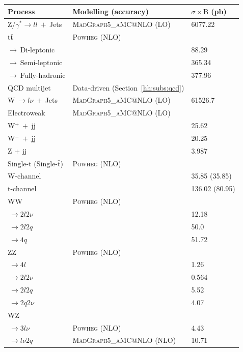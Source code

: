 \documentclass[../main.tex]{subfiles}
\begin{document}
\begin{table}[p]
\begin{footnotesize}
\begin{center}

	\begin{tabular}{l | l | l}
		\hline\hline
		Process & Modelling (accuracy) & $\sigma\times\mathrm{B}$ (pb) \\\hline\hline
		Z/$\gamma^*\to ll~+~$Jets & \textsc{MadGraph5\_aMC@NLO} (LO) & 6077.22 \\\hline
		$\text{t}\bar{\text{t}}$ & \textsc{Powheg} (NLO) & \\
		\quad $\to~$Di-leptonic & & 88.29 \\
		\quad $\to~$Semi-leptonic & & 365.34 \\
		\quad $\to~$Fully-hadronic & & 377.96 \\
\hline
	 	QCD multijet & Data-driven (Section~\ref{hh:subs:qcd}) & \\
\hline
		W$~\to l\nu~+~$Jets &  \textsc{MadGraph5\_aMC@NLO} (LO) & 61526.7\\
\hline
		Electroweak & \textsc{MadGraph5\_aMC@NLO} (LO) & \\
		W${}^+~+~$jj & & 25.62 \\
		W${}^-~+~$jj & & 20.25 \\
		Z + jj & & 3.987 \\
\hline
		Single-t (Single-$\bar{\text{t}}$) & \textsc{Powheg} (NLO) & \\
		W-channel & & 35.85 (35.85) \\
		t-channel & & 136.02 (80.95) \\
\hline
		WW & \textsc{Powheg} (NLO) & \\
		\quad$~\to 2l2\nu$ & & 12.18 \\
		\quad$~\to 2l2q$ & & 50.0 \\
		\quad$~\to 4q$ & & 51.72 \\
\hline
		ZZ & \textsc{Powheg} (NLO) & \\
		\quad$~\to 4l$ & & 1.26 \\
		\quad$~\to 2l2\nu$ & & 0.564 \\
		\quad$~\to 2l2q$ & & 5.52 \\
		\quad$~\to 2q2\nu$ & & 4.07 \\
\hline
		WZ & & \\
		\quad$~\to 3l\nu$ & \textsc{Powheg} (NLO) & 4.43 \\
		\quad$~\to l\nu2q$ & \textsc{MadGraph5\_aMC@NLO} (NLO) & 10.71 \\

\end{tabular}
\end{center}
\end{footnotesize}
\end{table}
\end{document}
